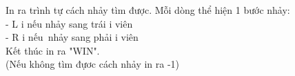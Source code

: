 In ra trình tự cách nhảy tìm được. Mỗi dòng thể hiện 1 bước nhảy:   
\\   - L i  nếu nhảy sang trái i viên   
\\   - R i  nếu nhảy sang phải i viên   
\\   Kết thúc in ra "WIN".   
\\   (Nếu không tìm đựơc cách nhảy in ra -1)   
\\
\\
\\